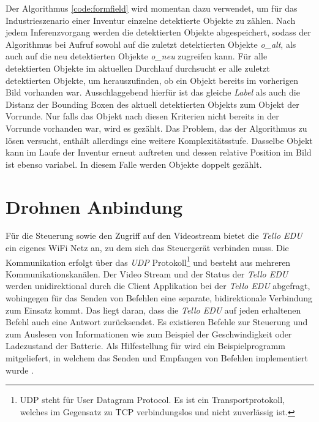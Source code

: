 

Der Algorithmus \ref{code:formfield} wird momentan dazu verwendet, um für das Industrieszenario einer Inventur einzelne detektierte Objekte zu zählen. Nach jedem Inferenzvorgang werden die detektierten Objekte abgespeichert, sodass der Algorithmus bei Aufruf sowohl auf die zuletzt detektierten Objekte \textit{o\_alt}, als auch auf die neu detektierten Objekte \textit{o\_neu} zugreifen kann. Für alle detektierten Objekte im aktuellen Durchlauf durchsucht er alle zuletzt detektierten Objekte, um herauszufinden, ob ein Objekt bereits im vorherigen Bild vorhanden war. Ausschlaggebend hierfür ist das gleiche \textit{Label} als auch die Distanz der Bounding Boxen des aktuell detektierten Objekts zum Objekt der Vorrunde. Nur falls das Objekt nach diesen Kriterien nicht bereits in der Vorrunde vorhanden war, wird es gezählt. Das Problem, das der Algorithmus zu lösen versucht, enthält allerdings eine weitere Komplexitätsstufe. Dasselbe Objekt kann im Laufe der Inventur erneut auftreten und dessen relative Position im Bild ist ebenso variabel. In diesem Falle werden Objekte doppelt gezählt. 

\section{Drohnen Anbindung}
Für die Steuerung sowie den Zugriff auf den Videostream bietet die \textit{Tello EDU} ein eigenes WiFi Netz an, zu dem sich das Steuergerät verbinden muss. Die Kommunikation erfolgt über das \textit{UDP} Protokoll\footnote{UDP steht für User Datagram Protocol. Es ist ein Transportprotokoll, welches im Gegensatz zu TCP verbindungslos und nicht zuverlässig ist.} und besteht aus mehreren Kommunikationskanälen. Der Video Stream und der Status der \textit{Tello EDU} werden unidirektional durch die Client Applikation bei der \textit{Tello EDU} abgefragt, wohingegen für das Senden von Befehlen eine separate, bidirektionale Verbindung zum Einsatz kommt. Das liegt daran, dass die \textit{Tello EDU} auf jeden erhaltenen Befehl auch eine Antwort zurücksendet. Es existieren Befehle zur Steuerung und zum Auslesen von Informationen wie zum Beispiel der Geschwindigkeit oder Ladezustand der Batterie. Als Hilfestellung für wird ein Beispielprogramm mitgeliefert, in welchem das Senden und Empfangen von Befehlen implementiert wurde \cite{RyzeTech.2018}. 

